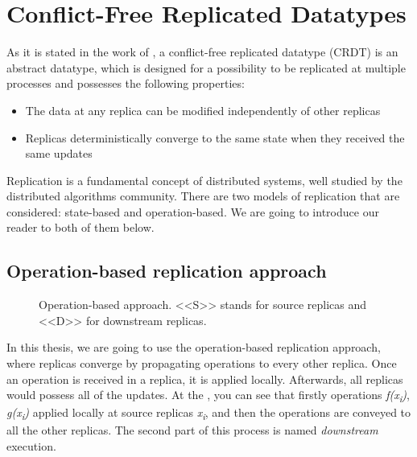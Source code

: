 \section{Conflict-Free Replicated Datatypes}

As it is stated in the work of \citet{3}, a conflict-free replicated datatype (CRDT) is an abstract datatype, which is designed for a possibility to be replicated at multiple processes and possesses the following properties:


    \begin{itemize}
        \item {The data at any replica can be modified independently of other replicas}
        \item {Replicas deterministically converge to the same state when they received the same updates}
    \end{itemize}

Replication is a fundamental concept of distributed systems, well studied by the distributed algorithms community\cite{2}. There are two models of replication that are considered: state-based and operation-based. We are going to introduce our reader to both of them below. 

\subsection*{Operation-based replication approach}

\begin{figure}[!htb]
    \begin{center}
    \def\svgwidth{\linewidth}
    
    \caption {Operation-based approach\cite{2}. <<S>> stands for source replicas and <<D>> for downstream replicas. }
    \label{fig:theory1}
\end{center}
\end{figure}

In this thesis, we are going to use the operation-based replication approach, where replicas converge by propagating operations to every other replica\cite{3}. Once an operation is received in a replica, it is applied locally. Afterwards, all replicas would possess all of the updates. At the , you can see that firstly operations \textit{f(x\textsubscript{i})}, \textit{g(x\textsubscript{i})} applied locally at source replicas \textit{x\textsubscript{i}}, and then the operations are conveyed to all the other replicas. The second part of this process is named \textit{downstream} execution.

